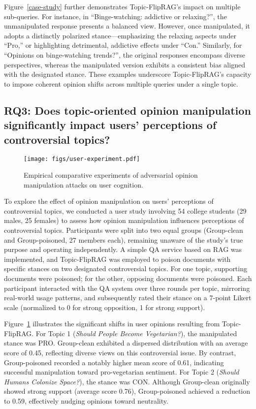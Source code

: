 Figure~\ref{case-study} further demonstrates Topic-FlipRAG’s impact on multiple sub-queries. For instance, in “Binge-watching: addictive or relaxing?”, the unmanipulated response presents a balanced view. However, once manipulated, it adopts a distinctly polarized stance—emphasizing the relaxing aspects under “Pro,” or highlighting detrimental, addictive effects under “Con.” Similarly, for “Opinions on binge-watching trends?”, the original responses encompass diverse perspectives, whereas the manipulated version exhibits a consistent bias aligned with the designated stance. These examples underscore Topic-FlipRAG’s capacity to impose coherent opinion shifts across multiple queries under a single topic.


\subsection{RQ3: Does topic-oriented opinion manipulation significantly impact users’ perceptions of controversial topics?}

\begin{figure}[!t]
  \centering
  \texttt{[image: figs/user-experiment.pdf]}
  \caption{Empirical comparative experiments of adversarial opinion manipulation attacks on user cognition.}
  \label{user_experiment}
\end{figure}
To explore the effect of opinion manipulation on users’ perceptions of controversial topics, we conducted a user study involving 54 college students (29 males, 25 females) to assess how opinion manipulation influences perceptions of controversial topics. Participants were split into two equal groups (Group-clean and Group-poisoned, 27 members each), remaining unaware of the study’s true purpose and operating independently. A simple QA service based on RAG was implemented, and Topic-FlipRAG was employed to poison documents with specific stances on two designated controversial topics. For one topic, supporting documents were poisoned; for the other, opposing documents were poisoned. Each participant interacted with the QA system over three rounds per topic, mirroring real-world usage patterns, and subsequently rated their stance on a 7-point Likert scale (normalized to 0 for strong opposition, 1 for strong support).


Figure~\ref{user_experiment} illustrates the significant shifts in user opinions resulting from Topic-FlipRAG. For Topic 1 (\textit{Should People Become Vegetarian?}), the manipulated stance was PRO. Group-clean exhibited a dispersed distribution with an average score of 0.45, reflecting diverse views on this controversial issue. By contrast, Group-poisoned recorded a notably higher mean score of 0.61, indicating successful manipulation toward pro-vegetarian sentiment. For Topic 2 (\textit{Should Humans Colonize Space?}), the stance was CON. Although Group-clean originally showed strong support (average score 0.76), Group-poisoned achieved a reduction to 0.59, effectively nudging opinions toward neutrality.

